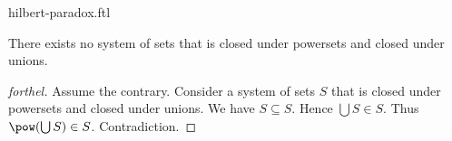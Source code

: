 \documentclass{naproche-library}
\begin{document}
\begin{smodule}[title=Hilbert's Paradox]{hilbert-paradox.ftl}

\begin{theorem*}[forthel,title=Hilbert's Paradox,id=hilbert_paradox]
  There exists no system of sets that is closed under powersets and closed under unions.
\end{theorem*}
\begin{proof}[forthel]
  Assume the contrary.
  Consider a system of sets $S$ that is closed under powersets and closed under unions.
  We have $S \subseteq S$.
  Hence $\bigcup S \in S$.
  Thus $\pow(\bigcup S) \in S$.
  Contradiction.
\end{proof}
\end{smodule}
\end{document}
